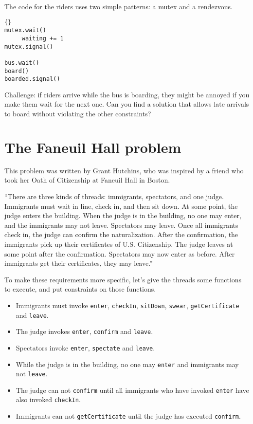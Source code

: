 \documentclass{book}
\newcommand{\clearemptydoublepage}{\newpage\cleardoublepage}
\begin{document}
The code for the riders uses two
simple patterns: a mutex and a rendezvous.

\begin{lstlisting}[title={Bus problem solution (riders)}]{}
mutex.wait()
     waiting += 1
mutex.signal()

bus.wait()
board()
boarded.signal()
\end{lstlisting}

Challenge: if riders arrive while the bus is boarding, they
might be annoyed if you make them wait for the next one.  Can you
find a solution that allows late arrivals to board without violating
the other constraints?


\clearemptydoublepage
\section{The Faneuil Hall problem}

This problem was written by Grant Hutchins, who was inspired
by a friend who took her
Oath of Citizenship at Faneuil Hall in Boston.

``There are three kinds of threads: immigrants, spectators, and one
judge.  Immigrants must wait in line, check in, and then sit down.  At
some point, the judge enters the building.  When the judge is in the
building, no one may enter, and the immigrants may not leave.
Spectators may leave.  Once all immigrants check in, the judge can
confirm the naturalization.  After the confirmation, the immigrants
pick up their certificates of U.S. Citizenship.  The judge leaves at
some point after the confirmation.  Spectators may now enter as
before.  After immigrants get their certificates, they may leave.''

To make these requirements more specific, let's give the threads
some functions to execute, and put constraints on those functions.

\begin{itemize}

\item Immigrants must invoke {\tt enter}, {\tt checkIn}, {\tt sitDown},
{\tt swear}, {\tt getCertificate} and {\tt leave}.

\item The judge invokes {\tt enter}, {\tt confirm} and {\tt leave}.

\item Spectators invoke {\tt enter}, {\tt spectate} and {\tt leave}.

\item While the judge is in the building, no one may {\tt enter}
and immigrants may not {\tt leave}.

\item The judge can not {\tt confirm} until all immigrants who have
invoked {\tt enter} have also invoked {\tt checkIn}.

\item Immigrants can not {\tt getCertificate} until the judge
has executed {\tt confirm}.

\end{itemize}
\end{document}
